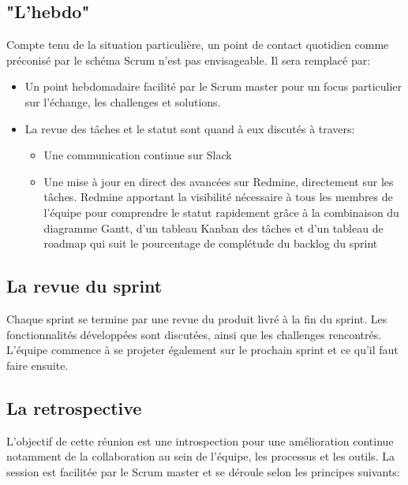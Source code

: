 \subsection{"L'hebdo"}

Compte tenu de la situation particulière, un point de contact quotidien comme préconisé par le schéma Scrum n’est pas envisageable.
 Il sera remplacé par:
 \begin{itemize}
       \item Un point hebdomadaire facilité par le Scrum master pour un focus particulier sur l'échange,
        les challenges et solutions. 
       \item La revue des tâches et le statut sont quand à eux discutés à travers:
       \begin{itemize}
             \item Une communication continue sur Slack
             \item Une mise à jour en direct des avancées sur Redmine, directement sur les tâches. Redmine apportant la visibilité nécessaire à tous les membres de l'équipe pour comprendre le statut rapidement grâce à la combinaison du diagramme Gantt, d’un tableau Kanban des tâches et d’un tableau de roadmap qui suit le pourcentage de complétude du backlog du sprint

       \end{itemize}
 \end{itemize}


\subsection{La revue du sprint}

Chaque sprint se termine par une revue du produit livré à la fin du sprint. Les fonctionnalités développées sont discutées, ainsi que les challenges rencontrés.
L'équipe commence à se projeter également sur le prochain sprint et ce qu’il faut faire ensuite.

\subsection{La retrospective}
L’objectif de cette réunion est une introspection pour une amélioration continue notamment de la collaboration au sein de l'équipe, les processus et les outils.
La session est facilitée par le Scrum master et se déroule selon les principes suivants:

